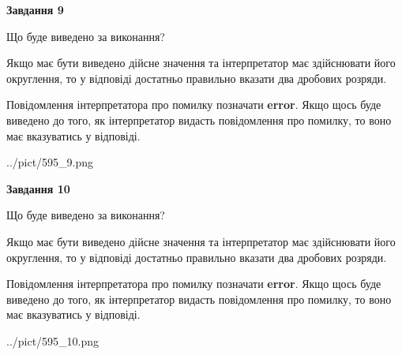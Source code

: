 \documentclass[12pt, ukrainian]{article}
\begin{document}
{\begin {Large}
{\begin {center}\textbf{Завдання 9}\end {center}}\par
Що буде виведено за виконання? \par

Якщо має бути виведено дійсне значення та інтерпретатор має здійснювати його округлення, 
то у відповіді достатньо правильно вказати два дробових розряди.

Повідомлення інтерпретатора про помилку позначати \textbf{error}.
Якщо щось буде виведено до того, як інтерпретатор видасть повідомлення про помилку, 
то воно має вказуватись у відповіді. \par

\begin{center}
	{../pict/595_9.png}
\end{center}
\newpage

{\begin {center}\textbf{Завдання 10}\end {center}}\par
Що буде виведено за виконання? \par

Якщо має бути виведено дійсне значення та інтерпретатор має здійснювати його округлення, 
то у відповіді достатньо правильно вказати два дробових розряди.

Повідомлення інтерпретатора про помилку позначати \textbf{error}.
Якщо щось буде виведено до того, як інтерпретатор видасть повідомлення про помилку, 
то воно має вказуватись у відповіді. \par

\begin{center}
	{../pict/595_10.png}
\end{center}
\newpage

\end {Large}}
\end{document}
